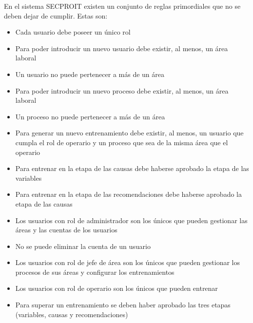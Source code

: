 En el sistema SECPROIT existen un conjunto de reglas primordiales que no se deben dejar de cumplir. Estas son:
\begin{itemize}
\item Cada usuario debe poseer un único rol
\item Para poder introducir un nuevo usuario debe existir, al menos, un área laboral
\item Un usuario no puede pertenecer a más de un área
\item Para poder introducir un nuevo proceso debe existir, al menos, un área laboral
\item Un proceso no puede pertenecer a más de un área
\item Para generar un nuevo entrenamiento debe existir, al menos, un usuario que cumpla el rol de operario y un proceso que sea de la misma área que el operario
\item Para entrenar en la etapa de las causas debe haberse aprobado la etapa de las variables
\item Para entrenar en la etapa de las recomendaciones debe haberse aprobado la etapa de las causas
\item Los usuarios con rol de administrador son los únicos que pueden gestionar las áreas y las cuentas de los usuarios
\item No se puede eliminar la cuenta de un usuario
\item Los usuarios con rol de jefe de área son los únicos que pueden gestionar los procesos de sus áreas y configurar los entrenamientos
\item Los usuarios con rol de operario son los únicos que pueden entrenar
\item Para superar un entrenamiento se deben haber aprobado las tres etapas (variables, causas y recomendaciones)
\end{itemize} 
